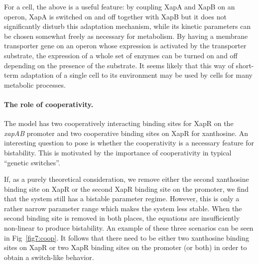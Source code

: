 \documentclass[10pt,letterpaper]{article}
\begin{document}
For a cell, the above is a useful feature: by coupling XapA and XapB on an
operon, XapA is switched on and off together with XapB but it does not
significantly disturb this adaptation mechanism, while its kinetic
parameters can be chosen somewhat freely as necessary for metabolism. By
having a membrane transporter gene on an operon whose expression is
activated by the transporter substrate, the expression of a whole set of
enzymes can be turned on and off depending on the presence of the substrate.
It seems likely that this way of short-term adaptation of a single cell to
its environment may be used by cells for many metabolic processes.

\paragraph*{The role of cooperativity.} 
The model has two cooperatively interacting binding sites for XapR on the
\emph{xapAB} promoter and two cooperative binding sites on XapR for
xanthosine. An interesting question to pose is whether the cooperativity is
a necessary feature for bistability. This is motivated by the importance of
cooperativity in typical ``genetic switches''\cite{Gardner2000,Cherry2000}.

If, as a purely theoretical consideration, we remove either the second
xanthosine binding site on XapR or the second XapR binding site on the
promoter, we find that the system still has a bistable parameter regime.
However, this is only a rather narrow parameter range which makes the system
less stable. When the second binding site is removed in both places, the
equations are insufficiently non-linear to produce bistability. An example
of these three scenarios can be seen in Fig~\ref{fig7:coop}. It follows that
there need to be either two xanthosine binding sites on XapR or two XapR
binding sites on the promoter (or both) in order to obtain a switch-like
behavior. 
\end{document}
